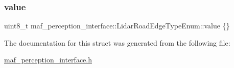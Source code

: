 \subsubsection{\texorpdfstring{value}{value}}
{\footnotesize\ttfamily uint8\+\_\+t maf\+\_\+perception\+\_\+interface\+::\+Lidar\+Road\+Edge\+Type\+Enum\+::value \{\}}



The documentation for this struct was generated from the following file\+:\begin{DoxyCompactItemize}
\item 
\hyperlink{maf__perception__interface_8h}{maf\+\_\+perception\+\_\+interface.\+h}\end{DoxyCompactItemize}
